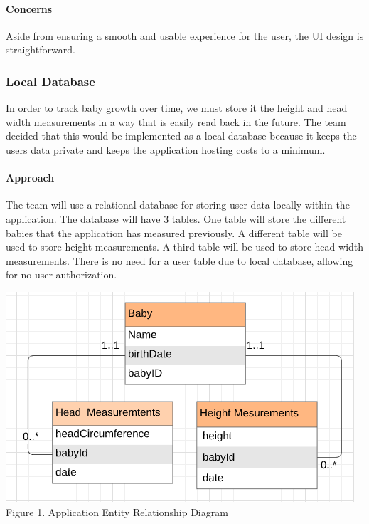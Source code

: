 \documentclass[onecolumn, draftclsnofoot,10pt, compsoc]{IEEEtran}
\begin{document}
\paragraph{Concerns}

Aside from ensuring a smooth and usable experience for the user, the UI design is straightforward.

\subsubsection{Local Database}

In order to track baby growth over time, we must store it the height and head width measurements in a way that is easily read back in the future. The team decided that this would be implemented as a local database because it keeps the users data private and keeps the application hosting costs to a minimum.\\

\paragraph{Approach}

The team will use a relational database for storing user data locally within the application. The database will have 3 tables. One table will store the different babies that the application has measured previously. A different table will be used to store height measurements. A third table will be used to store head width measurements. There is no need for a user table due to local database, allowing for no user authorization.\\

\begin{center}
    \includegraphics[scale=0.8]{ERdiagram}\\
    Figure 1. Application Entity Relationship Diagram \\
\end{center}
\end{document}
